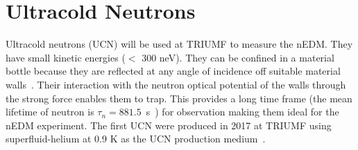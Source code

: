 

\section{Ultracold Neutrons}
Ultracold neutrons (UCN) will be used at TRIUMF to measure the nEDM. They have small kinetic energies ($<$ 300 neV).  They can be confined in a material bottle because they are reflected at any angle of incidence off suitable material walls~\cite{ucn_storage}. Their interaction with the neutron optical potential of the walls through the strong force enables them to trap. This provides a long time frame (the mean lifetime of neutron is $\tau_n=881.5$~s~\cite{mike}) for observation making them ideal for the nEDM experiment. The first UCN were produced in 2017 at TRIUMF using superfluid-helium at 0.9 K as the UCN production medium~\cite{TRIUMF_UCN,taraneh_theis,TRIUMF_Beamline}.

